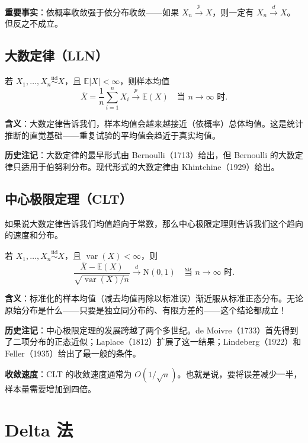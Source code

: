 \textbf{重要事实}：依概率收敛强于依分布收敛——如果 $X_n \xrightarrow{p} X$，则一定有 $X_n \xrightarrow{d} X$。但反之不成立。

\subsection{大数定律（LLN）}

\begin{Theorem}[弱大数定律]\label{def:law-large-numbers}
若 $X_1, \ldots, X_n \stackrel{\mathrm{iid}}{\sim} X$，且 $\mathbb{E}|X| < \infty$，则样本均值
\[
\bar{X} = \frac{1}{n}\sum_{i=1}^n X_i \xrightarrow{p} \mathbb{E}(X)
\quad \text{当 } n \to \infty \text{ 时}.
\]
\end{Theorem}

\textbf{含义}：大数定律告诉我们，样本均值会越来越接近（依概率）总体均值。这是统计推断的直觉基础——重复试验的平均值会趋近于真实均值。

\textbf{历史注记}：大数定律的最早形式由 Bernoulli（1713）给出，但 Bernoulli 的大数定律只适用于伯努利分布。现代形式的大数定律由 Khintchine（1929）给出。

\subsection{中心极限定理（CLT）}

如果说大数定律告诉我们均值趋向于常数，那么中心极限定理则告诉我们这个趋向的速度和分布。

\begin{Theorem}[中心极限定理]\label{def:central-limit-theorem}
若 $X_1, \ldots, X_n \stackrel{\mathrm{iid}}{\sim} X$，且 $\operatorname{var}(X) < \infty$，则
\[
\frac{\bar{X} - \mathbb{E}(X)}{\sqrt{\operatorname{var}(X)/n}} \xrightarrow{d} \mathrm{N}(0, 1)
\quad \text{当 } n \to \infty \text{ 时}.
\]
\end{Theorem}

\textbf{含义}：标准化的样本均值（减去均值再除以标准误）渐近服从标准正态分布。无论原始分布是什么——只要是独立同分布的、有限方差的——这个结论都成立！

\textbf{历史注记}：中心极限定理的发展跨越了两个多世纪。de Moivre（1733）首先得到了二项分布的正态近似；Laplace（1812）扩展了这一结果；Lindeberg（1922）和 Feller（1935）给出了最一般的条件。

\textbf{收敛速度}：CLT 的收敛速度通常为 $O(1/\sqrt{n})$。也就是说，要将误差减少一半，样本量需要增加到四倍。

\section{Delta 法}\label{sec:delta-method}

